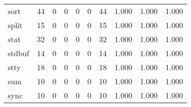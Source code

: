 \begin{longtable}{lp{1.3cm}p{1.3cm}p{1.3cm}p{1.3cm}p{1.3cm}p{1.3cm}p{1.3cm}p{1.3cm}p{1.3cm}}
sort      &                     44 &                                             0 &                                            0 &                                           0 &                                            0 &                                         44 &                                1.000 &                                  1.000 &                                1.000 \\
split     &                     15 &                                             0 &                                            0 &                                           0 &                                            0 &                                         15 &                                1.000 &                                  1.000 &                                1.000 \\
stat      &                     32 &                                             0 &                                            0 &                                           0 &                                            0 &                                         32 &                                1.000 &                                  1.000 &                                1.000 \\
stdbuf    &                     14 &                                             0 &                                            0 &                                           0 &                                            0 &                                         14 &                                1.000 &                                  1.000 &                                1.000 \\
stty      &                     18 &                                             0 &                                            0 &                                           0 &                                            0 &                                         18 &                                1.000 &                                  1.000 &                                1.000 \\
sum       &                     10 &                                             0 &                                            0 &                                           0 &                                            0 &                                         10 &                                1.000 &                                  1.000 &                                1.000 \\
sync      &                     10 &                                             0 &                                            0 &                                           0 &                                            0 &                                         10 &                                1.000 &                                  1.000 &                                1.000 \\

\end{longtable}
